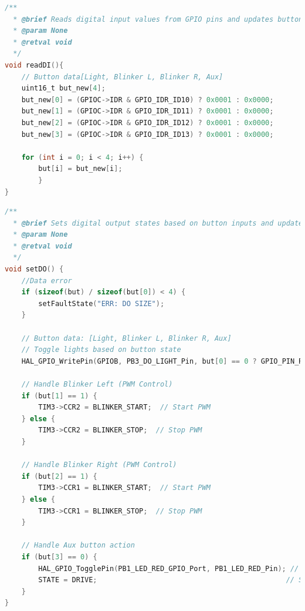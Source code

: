 \documentclass[paper=a4,11pt]{scrreprt}
\begin{document}
\newpage
\begin{lstlisting}[language=C, caption=\textbf{void readDI()},label={readDI}, mathescape=true, breaklines=true]
/**
  * @brief Reads digital input values from GPIO pins and updates button states
  * @param None
  * @retval void
  */
void readDI(){
    // Button data[Light, Blinker L, Blinker R, Aux]
    uint16_t but_new[4];
    but_new[0] = (GPIOC->IDR & GPIO_IDR_ID10) ? 0x0001 : 0x0000;
    but_new[1] = (GPIOC->IDR & GPIO_IDR_ID11) ? 0x0001 : 0x0000;
    but_new[2] = (GPIOC->IDR & GPIO_IDR_ID12) ? 0x0001 : 0x0000;
    but_new[3] = (GPIOC->IDR & GPIO_IDR_ID13) ? 0x0001 : 0x0000;

    for (int i = 0; i < 4; i++) {
    	but[i] = but_new[i];
        }
}
\end{lstlisting}
\newpage
\begin{lstlisting}[language=C, caption=\textbf{void setDO()},label={setDO}, mathescape=true, breaklines=true]
/**
  * @brief Sets digital output states based on button inputs and updates system behavior accordingly
  * @param None
  * @retval void
  */
void setDO() {
	//Data error
	if (sizeof(but) / sizeof(but[0]) < 4) {
		setFaultState("ERR: DO SIZE");
	}

    // Button data: [Light, Blinker L, Blinker R, Aux]
    // Toggle lights based on button state
    HAL_GPIO_WritePin(GPIOB, PB3_DO_LIGHT_Pin, but[0] == 0 ? GPIO_PIN_RESET : GPIO_PIN_SET);

    // Handle Blinker Left (PWM Control)
    if (but[1] == 1) {
        TIM3->CCR2 = BLINKER_START;  // Start PWM
    } else {
        TIM3->CCR2 = BLINKER_STOP;  // Stop PWM
    }

    // Handle Blinker Right (PWM Control)
    if (but[2] == 1) {
        TIM3->CCR1 = BLINKER_START;  // Start PWM
    } else {
        TIM3->CCR1 = BLINKER_STOP;  // Stop PWM
    }

    // Handle Aux button action
    if (but[3] == 0) {
        HAL_GPIO_TogglePin(PB1_LED_RED_GPIO_Port, PB1_LED_RED_Pin); // Toggle LED
        STATE = DRIVE;                                             // Set state to DRIVE
    }
}
\end{lstlisting}
\newpage
\end{document}
